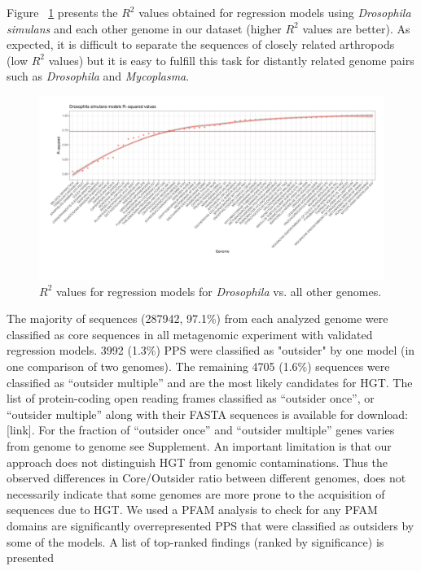 Figure ~\ref{fig:rsquared_curve} presents the $R^2$ values obtained for
regression models using \textit{Drosophila simulans} and each other genome in
our dataset (higher $R^2$ values are better). As expected, it is difficult to
separate the sequences of closely related arthropods (low $R^2$ values) but
it is easy to fulfill this task for distantly related genome pairs such as
\textit{Drosophila} and \textit{Mycoplasma}.
\begin{center}
\begin{figure}
\includegraphics[width=12cm]{figures/rsq_drosoph_bootstrapped.pdf}
\caption{$R^2$ values for regression models for \textit{Drosophila} vs. all
other genomes.}
\label{fig:rsquared_curve}
\end{figure}
\end{center}
The majority of sequences (287942, 97.1\%) from each analyzed genome were
classified as core sequences in all metagenomic experiment with validated
regression models. 3992 (1.3\%) PPS were classified as "outsider" by one model
(in one comparison of two genomes). The remaining 4705 (1.6\%) sequences were
classified as “outsider multiple” and are the most likely candidates for HGT.
The list of protein-coding open reading frames classified as “outsider once”,
or “outsider multiple” along with their FASTA sequences is available for
download: [link]. For the fraction of “outsider once” and “outsider multiple”
genes varies from genome to genome see Supplement. An important limitation is
that our approach does not distinguish HGT from genomic contaminations. Thus
the observed differences in Core/Outsider ratio between different genomes, does
not necessarily indicate that some genomes are more prone to the acquisition of
sequences due to HGT. We used a PFAM analysis to check for any PFAM domains are
significantly overrepresented PPS that were classified as outsiders by some of
the models. A list of top-ranked findings (ranked by significance) is presented

